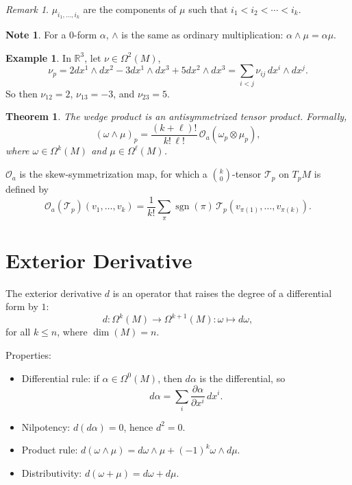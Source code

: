 \documentclass[11pt]{report}
\theoremstyle{definition}
\newtheorem{example}[definition]{Example}
\newtheorem{note}[definition]{Note}
\theoremstyle{plain}
\newtheorem{theorem}[definition]{Theorem}
\theoremstyle{remark}
\newtheorem{remark}[definition]{Remark}
\newcommand{\R}{\mathbb{R}}
\newcommand{\sgn}{\operatorname{sgn}}
\begin{document}
\begin{remark}
$\mu_{i_1,\dots,i_k}$ are the components of $\mu$ such that $i_1<i_2<\cdots<i_k$.
\end{remark}

\begin{note}
For a $0$-form $\alpha$, $\wedge$ is the same as ordinary multiplication: $\alpha\wedge\mu=\alpha\mu$.
\end{note}

\begin{example}
In $\R^3$, let $\nu\in\Omega^2(M)$,
\[
\nu_p = 2dx^1\wedge dx^2 - 3dx^1\wedge dx^3 + 5dx^2\wedge dx^3
= \sum_{i<j}\nu_{ij}\,dx^i\wedge dx^j.
\]
So then $\nu_{12}=2$, $\nu_{13}=-3$, and $\nu_{23}=5$.
\end{example}

\begin{theorem}
The wedge product is an antisymmetrized tensor product.
Formally,
\[
(\omega\wedge\mu)_p = \frac{(k+\ell)!}{k!\,\ell!}\,\mathcal O_a(\omega_p\otimes\mu_p),
\]
where $\omega\in\Omega^k(M)$ and $\mu\in\Omega^\ell(M)$.
\end{theorem}

$\mathcal O_a$ is the skew-symmetrization map, for which a $\binom{k}{0}$-tensor $\mathcal T_p$ on $T_pM$ is defined by
\[
\mathcal O_a(\mathcal T_p)(v_1,\dots,v_k)=\frac{1}{k!}\sum_{\pi}\sgn(\pi)\,\mathcal T_p(v_{\pi(1)},\dots,v_{\pi(k)}).
\]

\section{Exterior Derivative}

The exterior derivative $d$ is an operator that raises the degree of a differential form by $1$:
\[
d:\Omega^k(M)\to\Omega^{k+1}(M):\omega\mapsto d\omega,
\]
for all $k\le n$, where $\dim(M)=n$.

Properties:
\begin{itemize}
    \item Differential rule: if $\alpha\in\Omega^0(M)$, then $d\alpha$ is the differential, so
    \[
    d\alpha = \sum_i \frac{\partial\alpha}{\partial x^i}\,dx^i.
    \]
    \item Nilpotency: $d(d\alpha)=0$, hence $d^2=0$.
    \item Product rule: $d(\omega\wedge\mu)=d\omega\wedge\mu + (-1)^k\omega\wedge d\mu$.
    \item Distributivity: $d(\omega+\mu)=d\omega + d\mu$.
\end{itemize}
\end{document}
